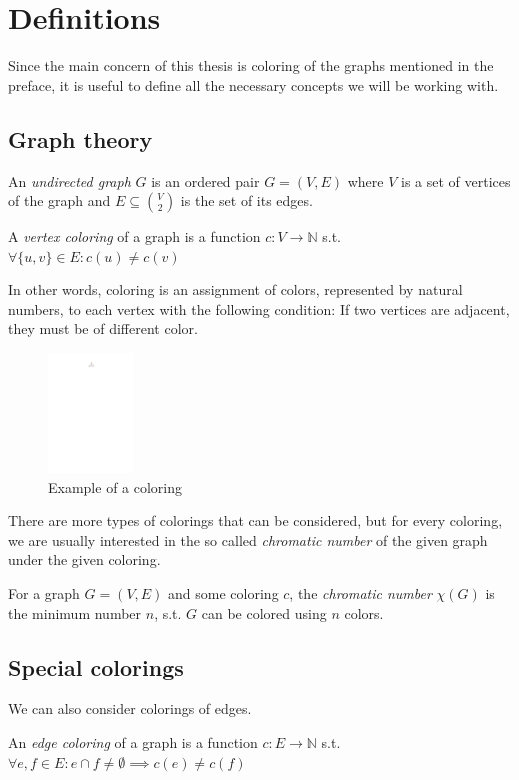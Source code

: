 \chapter{Definitions}

Since the main concern of this thesis is coloring of the graphs mentioned in the preface, it is useful to define all the necessary concepts we will be working with.

\section{Graph theory}

\begin{definition}
    An \textit{undirected graph} $G$ is an ordered pair $G=(V,E)$ where $V$ is a set of vertices of the graph and $E \subseteq \binom{V}{2}$ is the set of its edges.
\end{definition}

\begin{definition}
    A \textit{vertex coloring} of a graph is a function $c: V \rightarrow \mathbb{N}$ s.t. $\forall \{u,v\}\in E : c(u) \neq c(v)$
\end{definition}

In other words, coloring is an assignment of colors, represented by natural numbers, to each vertex with the following condition: If two vertices are adjacent, they must be of different color.

\begin{figure}[H]
    \centering
    \includegraphics[width=0.2\textwidth]{../Resources/Figs/tetrahedral_vtx_colr.pdf}
    \caption{Example of a coloring}
    \label{fig:tetrahedral_vtx_coloring}
\end{figure}

There are more types of colorings that can be considered, but for every coloring, we are usually interested in the so called \textit{chromatic number} of the given graph under the given coloring.

\begin{definition}
    For a graph $G=(V,E)$ and some coloring $c$, the \textit{chromatic number} $\chi(G)$ is the minimum number $n$, s.t. $G$ can be colored using $n$ colors.
\end{definition}

\section{Special colorings}

We can also consider colorings of edges.

\begin{definition}
    An \textit{edge coloring} of a graph is a function $c: E \rightarrow \mathbb{N}$ s.t. $\forall e,f \in E : e \cap f \neq \emptyset \implies c(e) \neq c(f)$
\end{definition}
